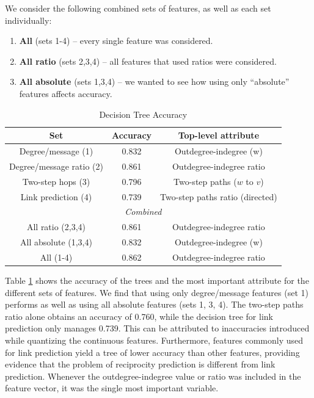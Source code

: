 \documentclass[conference]{IEEEtran}
\begin{document}
We consider the following combined sets of features, as well as each set individually:
\begin{enumerate}
	\item {\bf All} (sets 1-4) -- every single feature was considered.
	\item {\bf All ratio} (sets 2,3,4) -- all features that used ratios were considered.
	\item {\bf All absolute} (sets 1,3,4) -- we wanted to see how using only ``absolute'' features affects accuracy.
\end{enumerate}
\begin{table}[!t]
\renewcommand{\arraystretch}{1.3}
\caption{Decision Tree Accuracy}
\label{table_recresults_dtree}
\centering
\begin{tabular}{|c||c|c|}
\hline
\bf{Set} & Accuracy & Top-level attribute \\
\hline
Degree/message (1) & 0.832 & Outdegree-indegree (w) \\
Degree/message ratio (2) & 0.861 & Outdegree-indegree ratio \\
Two-step hops (3) & 0.796 & Two-step paths ($w$ to $v$) \\
Link prediction (4) & 0.739 & Two-step paths ratio (directed) \\
\hline
\multicolumn{3}{|c|}{\emph{Combined}} \\
\hline
All ratio (2,3,4) & 0.861 & Outdegree-indegree ratio \\
All absolute (1,3,4) & 0.832 & Outdegree-indegree (w) \\
All (1-4) & 0.862 & Outdegree-indegree ratio \\
\hline
\end{tabular}
\end{table}

Table \ref{table_recresults_dtree} shows the accuracy of the trees and
the most important attribute for the different sets of features. We
find that using only degree/message features (set 1)
performs as well as using all absolute features (sets 1, 3, 4). 
The two-step paths ratio alone obtains an accuracy
of 0.760, while the decision tree for link prediction only
manages 0.739. This can be attributed to inaccuracies introduced
while quantizing the continuous features.
Furthermore, features commonly used for
link prediction yield a tree of lower accuracy than other features, providing evidence that  
the problem of reciprocity prediction is different
from link prediction.
Whenever the outdegree-indegree value or ratio was included in the feature vector, it was the single most important variable.
\end{document}
